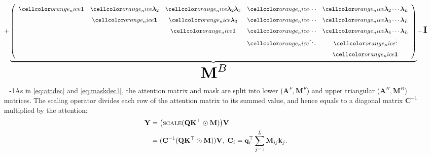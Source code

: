 {\begin{minipage}[t]{0.78\textwidth}
\begin{align}
{+
\underbrace{\left( \renewcommand*{\arraystretch}{1.5} \begin{array}{ccccc}
    \orange{\mathbf{1}}  & \orange{\boldsymbol{\lambda}_2} & \orange{\boldsymbol{\lambda}_2 \boldsymbol{\lambda}_3}  & \orange{\cdots} & \orange{\boldsymbol{\lambda}_2\cdots\boldsymbol{\lambda}_L} \\
     &  \orange{\mathbf{1}} & \orange{\boldsymbol{\lambda}_3} & \orange{\cdots} & \orange{\boldsymbol{\lambda}_3 \cdots \boldsymbol{\lambda}_L} \\
     &  & \orange{\mathbf{1}} & \orange{\cdots} & \orange{\boldsymbol{\lambda}_4 \cdots \boldsymbol{\lambda}_L} \\
     &  &  & \orange{\ddots} & \orange \vdots \\
     &  &  &  &   \orange{\mathbf{1}} \\   
\end{array} \right) }_{\hspace{1mm}\scalemath{2.5}{\mathbf{M}^B }} 
-
\hspace{0.5mm}\scalemath{1.5}{\mathbf{I}} \label{eq:maskdec1}
} 
\end{align}
\end{minipage} }




\looseness=-1As in \cref{eq:attdec} and \cref{eq:maskdec1}, the attention matrix and mask are split into lower (\(\mathbf{A}^F, \mathbf{M}^F\)) and upper triangular (\(\mathbf{A}^B, \mathbf{M}^B\)) matrices. The scaling operator divides each row of the attention matrix to its summed value, and hence %
equals to a diagonal matrix \(\mathbf{C}^{-1}\) multiplied by the attention:
\vspace{-3mm}
\begin{align}
\label{eq:Cintro}
   \mathbf{Y} &= \big(\textsc{scale}(\mathbf{Q}\mathbf{K}^{\top} \odot \mathbf{M})\big) \mathbf{V}  \notag \\
   & = (\mathbf{C}^{-1}(\mathbf{Q}\mathbf{K}^{\top} \odot \mathbf{M}))\mathbf{V}, \hspace{1mm}
   \mathbf{C}_i = \mathbf{q}^{\top}_i\sum\limits_{j=1}^{L} \mathbf{M}_{ij}\mathbf{k}_j. 
\end{align} 
\vspace{-5mm}

